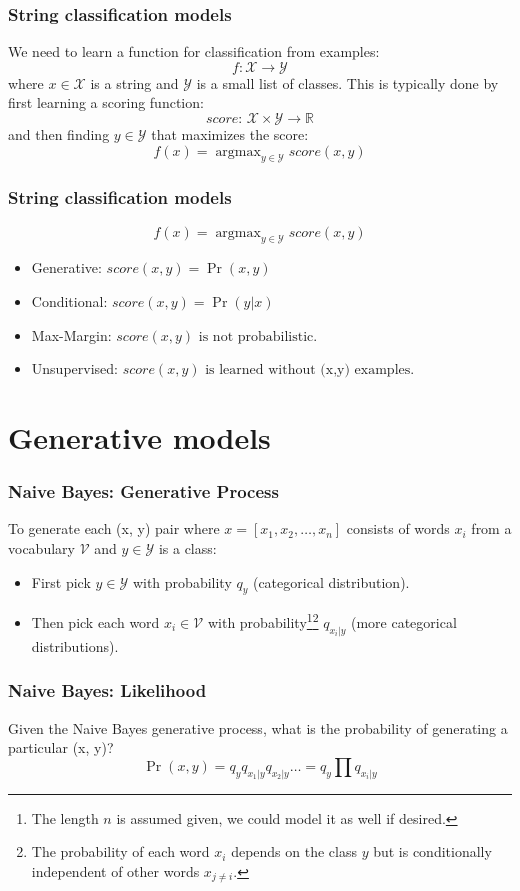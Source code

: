 \documentclass[ignorenonframetext,plain,fleqn]{beamer}
\newcommand{\vocab}{\mathcal{V}}
\DeclareMathOperator*{\argmax}{argmax}
\newcommand{\score}{\mathit{score}}
\begin{document}
\begin{frame}\frametitle{String classification models}
We need to learn a function for classification from examples:\[
f: \mathcal{X}\rightarrow\mathcal{Y}
\] where $x\in\mathcal{X}$ is a string and
$\mathcal{Y}$ is a small list of classes.  This is typically done
by first learning a scoring function:\[
\score:\, \mathcal{X}\times\mathcal{Y}\rightarrow\mathbb{R}
\] and then finding $y\in\mathcal{Y}$ that maximizes the score:\[
f(x) = \argmax_{y\in\mathcal{Y}}\score(x, y)
\]
\end{frame}

\begin{frame}\frametitle{String classification models}
\[
f(x) = \argmax_{y\in\mathcal{Y}}\score(x, y)
\]
\begin{itemize}
\item Generative: $
\score(x, y) = \Pr(x, y)
$
\item Conditional: $
\score(x, y) = \Pr(y | x)
$
\item Max-Margin: $
\score(x, y) \mbox{ is not probabilistic.}
$
\item Unsupervised: $
\score(x, y) \mbox{ is learned without (x,y) examples.}
$
\end{itemize}
\end{frame}

\section{Generative models}
\frame{\sectionpage}

\begin{frame}\frametitle{Naive Bayes: Generative Process}
To generate each (x, y) pair where $x = [x_1, x_2, \dots, x_n]$
consists of words $x_i$ from a vocabulary $\vocab$ and
$y\in\mathcal{Y}$ is a class:
\begin{itemize}
\item First pick $y\in\mathcal{Y}$ with probability $q_y$ (categorical
  distribution).
\item Then pick each word $x_i\in\vocab$ with probability\footnote{The
  length $n$ is assumed given, we could model it as well if
  desired.}\footnote{The probability of each word $x_i$ depends on the
  class $y$ but is conditionally independent of other words
  $x_{j\neq i}$.} $q_{x_i|y}$ (more categorical distributions).
\end{itemize}
\end{frame}

\begin{frame}\frametitle{Naive Bayes: Likelihood}
Given the Naive Bayes generative process, what is the probability of
generating a particular (x, y)?\[ \Pr(x, y) = q_y q_{x_1|y} q_{x_2|y}
\dots = q_y \prod q_{x_i|y}
\]
\end{frame}
\end{document}
